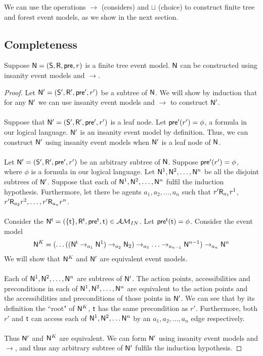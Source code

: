 We can use the operations $\to$ (considers) and $\sqcup$ (choice) to construct finite tree and
forest event models, as we show in the next section.

\subsection{Completeness}

\begin{lemma} \label{finTreeConstruct}
Suppose $\mathrm{\mathsf{N}} = (\mathrm{\mathsf{S}}, \mathrm{\mathsf{R}}, \mathrm{\mathsf{pre}}, r)$ is a finite tree event model.
$\mathrm{\mathsf{N}}$ can be constructed using insanity event models and $\to$.
\end{lemma}
\begin{proof}
Let $\mathrm{\mathsf{N}}' = (\mathrm{\mathsf{S}}', \mathrm{\mathsf{R}}', \mathrm{\mathsf{pre}}', r')$ be a subtree of $\mathrm{\mathsf{N}}$.
We will show by induction that for any $\mathrm{\mathsf{N}}'$ we can use insanity event models and $\to$ to
construct $\mathrm{\mathsf{N}}'$.\\
\\
Suppose that $\mathrm{\mathsf{N}}' = (\mathrm{\mathsf{S}}', \mathrm{\mathsf{R}}', \mathrm{\mathsf{pre}}', r')$ is a leaf node.
Let $\mathrm{\mathsf{pre}}'(r') = \phi$, a formula in our logical language.
$\mathrm{\mathsf{N}}'$ is an insanity event model by definition.
Thus, we can construct $\mathrm{\mathsf{N}}'$ using insanity event models when $\mathrm{\mathsf{N}}'$ is a leaf node of $\mathrm{\mathsf{N}}$.\\
\\
Let $\mathrm{\mathsf{N}}' = (\mathrm{\mathsf{S}}', \mathrm{\mathsf{R}}', \mathrm{\mathsf{pre}}', r')$ be an arbitrary subtree of $\mathrm{\mathsf{N}}$.
Suppose $\mathrm{\mathsf{pre}}'(r') = \phi$, where $\phi$ is a formula in our logical language.
Let $\mathrm{\mathsf{N}}^1, \mathrm{\mathsf{N}}^2, \ldots, \mathrm{\mathsf{N}}^n$ be all the disjoint subtrees of $\mathrm{\mathsf{N}}'$.
Suppose that each of $\mathrm{\mathsf{N}}^1, \mathrm{\mathsf{N}}^2, \ldots, \mathrm{\mathsf{N}}^n$ fulfil the induction hypothesis.
Furthermore, let there be agents $a_1, a_2, \ldots, a_n$ such that $r' \mathrm{\mathsf{R}}_{a_1} r^1$, $r' \mathrm{\mathsf{R}}_{a_2} r^2,
	\ldots, r' \mathrm{\mathsf{R}}_{a_n} r^n$.\\
\\
Consider the $\mathrm{\mathsf{N}}^\mathrm{\mathsf{t}} = (\{ \mathrm{\mathsf{t}} \}, \mathrm{\mathsf{R}}^\mathrm{\mathsf{t}}, \mathrm{\mathsf{pre}}^\mathrm{\mathsf{t}}, \mathrm{\mathsf{t}}) \in \mathcal{AM}_{IN}$.
Let $\mathrm{\mathsf{pre}}^\mathrm{\mathsf{t}}(\mathrm{\mathsf{t}}) = \phi$.
Consider the event model 
\[
\mathrm{\mathsf{N}}^K = (\ldots((\mathrm{\mathsf{N}}^\mathrm{\mathsf{t}} \to_{a_1} \mathrm{\mathsf{N}} ^ 1) \to_{a_2} \mathrm{\mathsf{N}}_2) \to_{a_3} \ldots
\to_{a_{n-1}} \mathrm{\mathsf{N}}^{n-1} ) \to_{a_n} \mathrm{\mathsf{N}} ^ n
\]
We will show that $\mathrm{\mathsf{N}}^K$ and $\mathrm{\mathsf{N}}'$ are equivalent event models.\\
\\
Each of $\mathrm{\mathsf{N}}^1, \mathrm{\mathsf{N}}^2, \ldots, \mathrm{\mathsf{N}}^n$ are subtrees of $\mathrm{\mathsf{N}}'$.
The action points, accessibilities and preconditions in each of $\mathrm{\mathsf{N}}^1, \mathrm{\mathsf{N}}^2, \ldots, \mathrm{\mathsf{N}}^n$ are
equivalent to the action points and the accessibilities and preconditions of those points in $\mathrm{\mathsf{N}}'$.
We can see that by its definition the ``root" of $\mathrm{\mathsf{N}}^K$, $\mathrm{\mathsf{t}}$ has the same precondition as $r'$.
Furthermore, both $r'$ and $\mathrm{\mathsf{t}}$ can access each of $\mathrm{\mathsf{N}}^1, \mathrm{\mathsf{N}}^2, \ldots \mathrm{\mathsf{N}}^n$ by an $a_1, a_2, \ldots, a_n$ edge
respectively.\\
\\
Thus $\mathrm{\mathsf{N}}'$ and $\mathrm{\mathsf{N}}^K$ are equivalent.
We can form $\mathrm{\mathsf{N}}'$ using insanity event models and $\to$, and thus any arbitrary subtree of $\mathrm{\mathsf{N}}'$
fulfils the induction hypothesis.
\end{proof}

